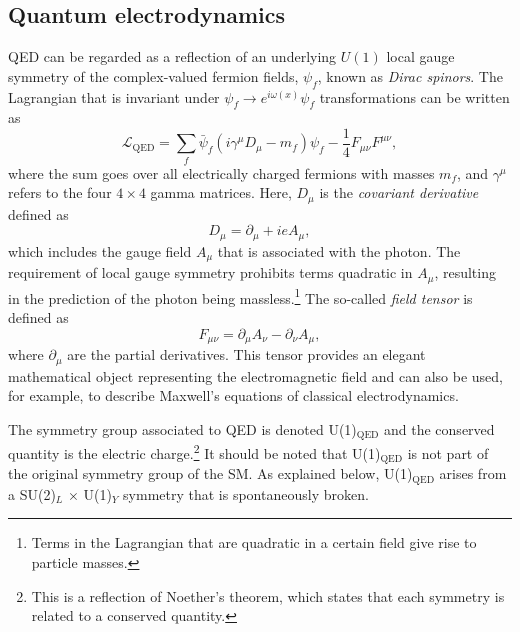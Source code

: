 \subsection{Quantum electrodynamics}
\label{subsec:qed}
QED can be regarded as a reflection of an underlying $U(1)$ local gauge symmetry of the complex-valued fermion fields, $\psi_f$, known as \emph{Dirac spinors}.
The Lagrangian that is invariant under $\psi_f \rightarrow e^{i \omega(x)} \psi_f$ transformations can be written as
\begin{equation}
  \mathcal{L}_{\text{QED}} = \sum_f \bar{\psi}_f(i\gamma^\mu D_\mu - m_f)\psi_f - \frac{1}{4}F_{\mu\nu}F^{\mu\nu},
  \label{eq:Lagrangianqed}
\end{equation}
where the sum goes over all electrically charged fermions with masses $m_f$, and $\gamma^\mu$ refers to the four $4 \times 4$ gamma matrices.
Here, $D_\mu$ is the \emph{covariant derivative} defined as
\begin{equation}
  D_\mu = \partial_\mu + ieA_\mu,
\end{equation}
which includes the gauge field $A_\mu$ that is associated with the photon. The requirement of local gauge symmetry prohibits terms quadratic in $A_\mu$, resulting in the prediction of the photon being massless.\footnote{Terms in the Lagrangian that are quadratic in a certain field give rise to particle masses.}
The so-called \emph{field tensor} is defined as
\begin{equation}
  F_{\mu\nu} = \partial_\mu A_\nu - \partial_\nu A_\mu,
\end{equation}
where $\partial_\mu$ are the partial derivatives. This tensor provides an elegant mathematical object representing the electromagnetic field and can also be used, for example, to describe Maxwell's equations of classical electrodynamics.

The symmetry group associated to QED is denoted U(1)$_{\text{QED}}$ and the conserved quantity is the electric charge.\footnote{This is a reflection of Noether's theorem, which states that each symmetry is related to a conserved quantity.}
It should be noted that U(1)$_{\text{QED}}$ is not part of the original symmetry group of the SM. As explained below, U(1)$_{\text{QED}}$ arises from a SU(2)$_L$ $\times$ U(1)$_Y$ symmetry that is spontaneously broken.


